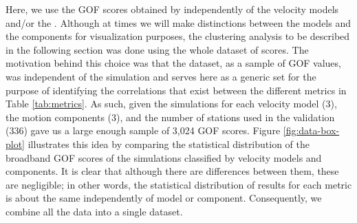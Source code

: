 Here, we use the GOF scores obtained by \citet{Taborda_2014_BSSA} independently of the velocity models and/or the . Although at times we will make distinctions between the models and the components for visualization purposes, the clustering analysis to be described in the following section was done using the whole dataset of scores. The motivation behind this choice was that the dataset, as a sample of GOF values, was independent of the simulation and serves here as a generic set for the purpose of identifying the correlations that exist between the different metrics in Table \ref{tab:metrics}. As such, given the simulations for each velocity model (3), the motion components (3), and the number of stations used in the validation (336) gave us a large enough sample of 3,024 GOF scores. Figure \ref{fig:data-box-plot} illustrates this idea by comparing the statistical distribution of the broadband GOF scores of the simulations classified by velocity models and components. It is clear that although there are differences between them, these are negligible; in other words, the statistical distribution of results for each metric is about the same independently of model or component. Consequently, we combine all the data into a single dataset.
